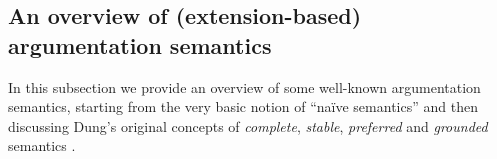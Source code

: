 \begin{comment}
        \item 
        \textit{defensible} iff $\exists E_1,E_2 \in \mathcal{E}_\sigma (\mathcal{AF}): a \in E_1, a \not\in E_2$;


        \item 
        \textit{overruled} iff $\forall E \in \mathcal{E}_\sigma(\mathcal{AF}): a \not\in E$. 
        \hfill ($a$ should be rejected)
    \end{itemize}
\end{df}


\end{comment}


\subsection{An overview of (extension-based) argumentation semantics}


In this subsection we provide an overview of some well-known argumentation semantics, 
starting from the very basic notion of ``na\"{i}ve semantics'' \cite[\S~3.2]{Bar.Cam.Gia2018} and then 
discussing Dung's original concepts of \textit{complete}, \textit{stable}, \textit{preferred} and \textit{grounded} semantics \cite{Dun1995}.


% 







